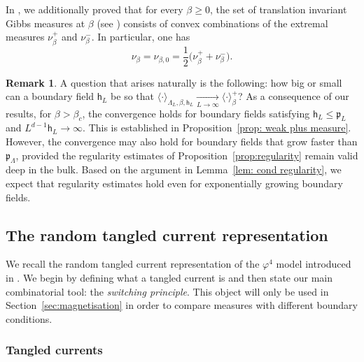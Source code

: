 \documentclass[11pt,a4paper]{article}
\theoremstyle{definition}
\newtheorem{remark}[theorem]{Remark}
\numberwithin{equation}{section}
\begin{document}
In \cite{GunaratnamPanagiotisPanisSeveroPhi42022}, we additionally proved that for every $\beta\geq0$, the set of translation invariant Gibbs measures at $\beta$ (see \cite[Definition 1.1]{GunaratnamPanagiotisPanisSeveroPhi42022}) consists of convex combinations of the extremal measures $\nu^+_\beta$ and $\nu^-_\beta$. In particular, one has
\begin{equation}\label{eq:free=plus+minus/2}
    \nu_\beta=\nu_{\beta,0}=\frac{1}{2}\Big(\nu^+_\beta+\nu_\beta^-\Big).
\end{equation}


\begin{remark}\label{rem:def_p}
A question that arises naturally is the following: how big or small can a boundary field $\mathsf{h}_L$ be so that $\langle \cdot \rangle_{\Lambda_L,\beta,\mathsf{h}_L}\underset{L\to\infty}{\longrightarrow} \langle \cdot \rangle^+_\beta$? As a consequence of our results, for $\beta>\beta_c$, the convergence holds for boundary fields satisfying $\mathsf{h}_L\leq \mathfrak{p}_L$ and $L^{d-1}\mathsf{h}_L\to\infty$. This is established in Proposition~\textup{\ref{prop: weak plus measure}}. However, the convergence may also hold for boundary fields that grow faster than $\mathfrak{p}_{\Lambda}$, provided the regularity estimates of Proposition~\textup{\ref{prop:regularity}} remain valid deep in the bulk. Based on the argument in Lemma~\textup{\ref{lem: cond regularity}}, we expect that regularity estimates hold even for exponentially growing boundary fields. 
\end{remark}







\subsection{The random tangled current representation}\label{sec:tangled_currents}


We recall the random tangled current representation of the $\varphi^4$ model introduced in \cite{GunaratnamPanagiotisPanisSeveroPhi42022}. We begin by defining what a tangled current is and then state our main combinatorial tool: the \emph{switching principle}. This object will only be used in Section~\ref{sec:magnetisation} in order to compare measures with different boundary conditions.


\subsubsection{Tangled currents}
\end{document}
